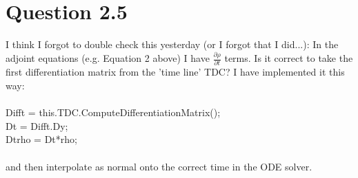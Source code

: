 \documentclass[11pt, a4paper]{article}
\theoremstyle{definition}
\begin{document}
\section{Question 2.5}
I think I forgot to double check this yesterday (or I forgot that I did...): In the adjoint equations (e.g. Equation 2 above) I have $\frac{\partial \rho}{\partial t}$ terms. Is it correct to take the first differentiation matrix from the 'time line' TDC?
I have implemented it this way:\\
\\
Difft = this.TDC.ComputeDifferentiationMatrix();\\
Dt = Difft.Dy;\\
Dtrho = Dt*rho;\\
\\
and then interpolate as normal onto the correct time in the ODE solver.
\end{document}
